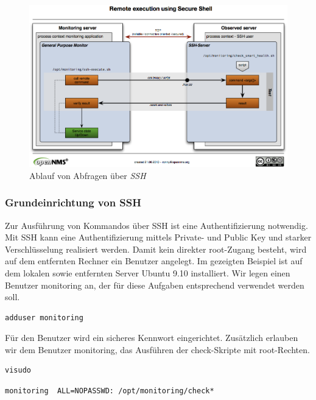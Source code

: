 \begin{figure}[H]
	\centering
	\includegraphics[width=1.0\textwidth]{images/use-cases/script-extending-linux/flow-ssh}
	\caption{Ablauf von Abfragen über \emph{SSH}}
	\label{pic:flow-ssh}
\end{figure}

\subsubsection{Grundeinrichtung von SSH}
Zur Ausführung von Kommandos über SSH ist eine Authentifizierung notwendig. Mit SSH kann eine Authentifizierung mittels Private- und Public Key und starker Verschlüsselung realisiert werden. Damit kein direkter root-Zugang besteht, wird auf dem entfernten Rechner ein Benutzer angelegt. Im gezeigten Beispiel ist auf dem lokalen sowie entfernten Server Ubuntu 9.10 installiert. Wir legen einen Benutzer monitoring an, der für diese Aufgaben entsprechend verwendet werden soll.

\begin{lstlisting}[numbers=none]
adduser monitoring
\end{lstlisting}

Für den Benutzer wird ein sicheres Kennwort eingerichtet. Zusätzlich erlauben wir dem Benutzer monitoring, das Ausführen der check-Skripte mit root-Rechten.

\begin{lstlisting}[numbers=none]
visudo
\end{lstlisting}

\begin{lstlisting}[numbers=none]
monitoring  ALL=NOPASSWD: /opt/monitoring/check*
\end{lstlisting}

